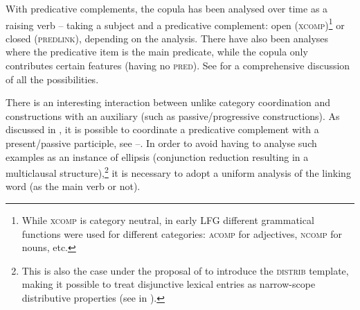 \documentclass[output=paper]{../langscibook}
\begin{document}
With predicative
complements, the copula has been analysed over time as a raising verb
– taking a subject and a predicative complement: open
(\textsc{xcomp})\footnote{While \textsc{xcomp} is category
  neutral, in early LFG \citep{bresnan1982the-passive,kaplanbresnan82} different
  grammatical functions were used for different categories:
  \textsc{acomp} for adjectives, \textsc{ncomp} for nouns, etc.} or
closed (\textsc{predlink}), depending on the analysis. There have also
been analyses where the predicative item is the main
predicate, while the copula only contributes certain features (having no
\textsc{pred}). See \citet{dalrympleetal04copular} for a comprehensive
discussion of all the possibilities.

There is an interesting interaction between unlike category
coordination and constructions with an auxiliary (such as
passive/progressive constructions). As discussed
in \citet{pete:81,pete:04}, it is possible to coordinate a
predicative complement with a present/passive participle, see –. In order to avoid
having to analyse such examples as an instance of ellipsis (conjunction reduction resulting in a
multiclausal structure),\footnote{This is also the case under
  the proposal of \citet{kapl:17} to introduce the
  \textsc{distrib} template, making it possible to treat disjunctive
  lexical entries as narrow-scope distributive properties (see
   in ).} it is necessary to adopt a uniform analysis
of the linking word (as the main verb or not).
\end{document}
